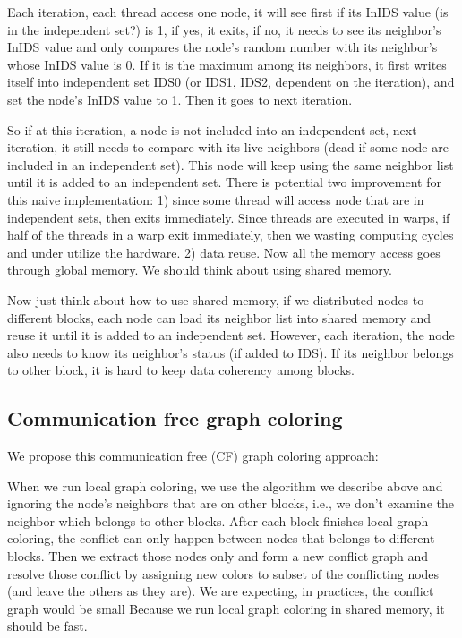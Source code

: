\documentclass[12pt] {article}
\begin{document}
Each iteration, each thread access one node, it will see first if its InIDS value (is in the independent set?) is 1, if yes, it exits, if no, it needs to see its neighbor's InIDS value and only compares the node's random number with its neighbor's whose InIDS value is 0. If it is the maximum among its neighbors, it first writes itself into independent set IDS0 (or IDS1, IDS2, dependent on the iteration), and set the node's InIDS value to 1. Then it goes to next iteration. 

So if at this iteration, a node is not included into an independent set, next iteration, it still needs to compare with its live neighbors (dead if some node are included in an independent set). This node will keep using the same neighbor list until it is added to an independent set. There is potential two improvement for this naive implementation: 1) since some thread will access node that are in independent sets, then exits immediately. Since threads are executed in warps, if half of the threads in a warp exit immediately, then we wasting computing cycles and under utilize the hardware. 2) data reuse. Now all the memory access goes through global memory. We should think about using shared memory.

Now just think about how to use shared memory, if we distributed nodes to different blocks, each node can load its neighbor list into shared memory and reuse it until it is added to an independent set. However, each iteration, the node also needs to know its neighbor's status (if added to IDS). If its neighbor belongs to other block, it is hard to keep data coherency among blocks. 

\subsection*{Communication free graph coloring}
We propose this communication free (CF) graph coloring approach:


When we run local graph coloring, we use the algorithm we describe above and ignoring the node's neighbors that are on other blocks, i.e., we don't examine the neighbor which belongs to other blocks. After each block finishes local graph coloring, the conflict can only happen between nodes that belongs to different blocks. Then we extract those nodes only and form a new conflict graph and resolve those conflict by assigning new colors to subset of the conflicting nodes (and leave the others as they are). We are expecting, in practices, the conflict graph would be small %
Because we run local graph coloring in shared memory, it should be fast. 
\end{document}
